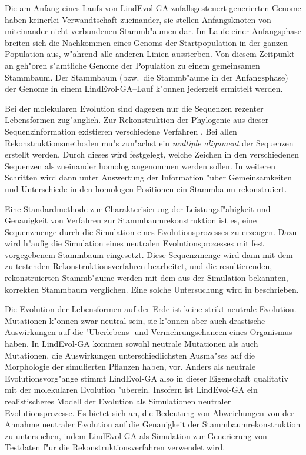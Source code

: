 Die am Anfang eines Laufs von LindEvol-GA zufallsgesteuert generierten Genome haben keinerlei Verwandtschaft zueinander,
sie stellen Anfangsknoten von miteinander nicht verbundenen Stammb"aumen dar. Im Laufe einer Anfangsphase breiten sich
die Nachkommen eines Genoms der Startpopulation in der ganzen Population aus, w"ahrend alle anderen Linien aussterben.
Von diesem Zeitpunkt an geh"oren s"amtliche Genome der Population zu einem gemeinsamen Stammbaum. Der Stammbaum 
(bzw.\ die Stammb"aume in der Anfangsphase) der Genome in einem LindEvol-GA--Lauf k"onnen jederzeit ermittelt werden.

Bei der molekularen Evolution sind dagegen nur die Sequenzen rezenter Lebensformen zug"anglich. Zur Rekonstruktion der
Phylogenie aus dieser Sequenzinformation existieren verschiedene Verfahren \cite{Felsenstein88}.
Bei allen Rekonstruktionsmethoden mu"s zun"achst ein \textsl{multiple alignment} \cite{GCG} der Sequenzen erstellt
werden. Durch dieses wird festgelegt, welche Zeichen in den verschiedenen Sequenzen als zueinander homolog
angenommen werden sollen. In weiteren Schritten wird dann unter Auswertung der Information "uber Gemeinsamkeiten und
Unterschiede in den homologen Positionen ein Stammbaum rekonstruiert.

Eine Standardmethode zur Charakterisierung der Leistungsf"ahigkeit und
Genauigkeit von Verfahren zur Stammbaumrekonstruktion ist es, eine Sequenzmenge durch die Simulation eines Evolutionsprozesses
zu erzeugen. Dazu wird h"aufig die Simulation eines neutralen Evolutionsprozesses mit fest vorgegebenem Stammbaum
eingesetzt. Diese Sequenzmenge wird dann mit dem zu testenden Rekonstruktionsverfahren bearbeitet, und die resultierenden,
rekonstruierten Stammb"aume werden mit dem aus der Simulation bekannten, korrekten Stammbaum verglichen. Eine solche
Untersuchung wird in \cite{KuhnerFelsenstein} beschrieben.

Die Evolution der Lebensformen auf der Erde ist keine strikt neutrale Evolution. Mutationen k"onnen zwar neutral sein,
sie k"onnen aber auch drastische Auswirkungen auf die "Uberlebens- und Vermehrungschancen eines Organismus haben.
In LindEvol-GA kommen sowohl neutrale Mutationen als auch Mutationen, die Auswirkungen unterschiedlichsten Ausma"ses
auf die Morphologie der simulierten Pflanzen haben, vor. Anders als neutrale Evolutionsvorg"ange stimmt LindEvol-GA also
in dieser Eigenschaft qualitativ mit der molekularen Evolution "uberein. Insofern ist LindEvol-GA ein realistischeres
Modell der Evolution als Simulationen neutraler Evolutionsprozesse. Es bietet sich an, die Bedeutung von Abweichungen
von der Annahme neutraler Evolution auf die Genauigkeit der Stammbaumrekonstruktion zu untersuchen, indem LindEvol-GA
als Simulation zur Generierung von Testdaten f"ur die Rekonstruktionsverfahren verwendet wird.

